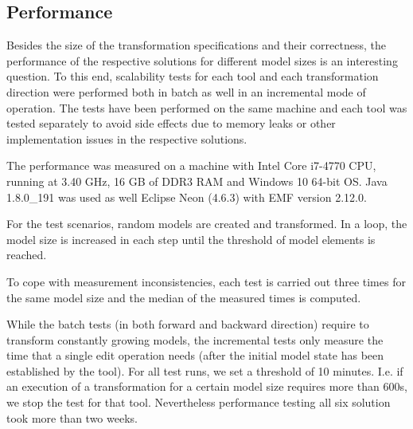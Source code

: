 \subsection{Performance}
\label{sec:Performance}



Besides the size of the transformation specifications and their correctness, the performance of the respective solutions for different model sizes is an interesting question. To this end, scalability tests for each tool and each transformation direction were performed both in batch as well in an incremental mode of operation. The tests have been performed on the same machine and each tool was tested separately to avoid side effects due to memory leaks or other implementation issues in the respective solutions. 

The performance was measured on a machine with Intel Core i7-4770 CPU, running at 3.40 GHz, 16 GB of DDR3 RAM and Windows 10 64-bit OS. Java 1.8.0\_191 was used as well Eclipse Neon (4.6.3) with EMF version 2.12.0.

For the test scenarios, random models are created and transformed. In a loop, the model size is increased in each step until the threshold of model elements is reached. 

To cope with measurement inconsistencies, each test is carried out three times for the same model size and the median of the measured times is computed. 

While the batch tests (in both forward and backward direction) require to transform constantly growing models, the incremental tests only measure the time that a single edit operation needs (after the initial model state has been established by the tool). For all test runs, we set a threshold of 10 minutes. I.e. if an execution of a transformation for a certain model size requires more than 600s, we stop the test for that tool. Nevertheless performance testing all six solution took more than two weeks.

